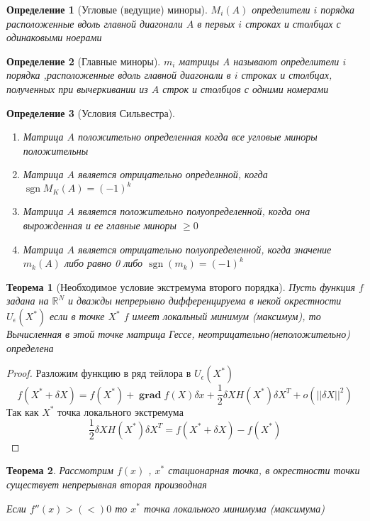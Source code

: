 \documentclass[14pt]{extarticle}
\newtheorem{theorem}{Теорема}
\newtheorem{definiiton}{Определение}
\DeclareMathOperator{\grad}{\textbf{grad}}
\DeclareMathOperator{\sgn}{sgn}
\begin{document}
\begin{definiiton}[Угловые (ведущие) миноры]
	$M_{i}(A)$ определители $i$ порядка расположенные вдоль
	главной диагонали  $A$ в первых  $i$ строках и столбцах с
	одинаковыми ноерами
\end{definiiton}
\begin{definiiton}[Главные миноры]
	$m_{i}$ матрицы A называют определители $i$ порядка
	,расположенные вдоль главной диагонали в  $i$ строках и столбцах, полученных при вычеркивании из  $A$ строк и столбцов с одними номерами
\end{definiiton}
\begin{definiiton}[Условия Сильвестра]
	 \begin{enumerate}
		\item Матрица $A$ положительно определенная  когда
			все угловые миноры положительны
		\item Матрица $A$ является отрицательно определнной, когда  $\sgn M_{K}(A) = (-1)^{k}$
		\item Матрица $A$ является положительно полуопределенной, когда она вырожденная и ее главные миноры  $\ge 0$
		\item Матрица $A$ является отрицательно полуопределенной, когда значение  $m_{k}(A)$ либо равно 0 либо $\sgn(m_{k}) = (-1)^{k}$
	\end{enumerate}
\end{definiiton}
\begin{theorem}[Необходимое условие экстремума второго порядка]
	Пусть функция $f$ задана на  $\mathbb{R}^{N}$ 
	и дважды непрерывно дифференцируема в некой окрестности 
	$U_{\epsilon}(X^{*})$ если в точке 
	$X^{*}$ $f$ имеет локальный минимум (максимум),
	то Вычисленная в этой точке матрица Гессе, неотрицательно(неположительно) определена
\end{theorem}
\begin{proof}
	Разложим функцию в ряд тейлора в $U_{\epsilon}(X^{*})$
	 \begin{equation}
		 f(X^{*} + \delta X) = f(X^{*}) + \grad f(X) \delta x  + \frac{1}{2} \delta X H(X^{*}) \delta X^{T} + o(||\delta X||^2)
	 \end{equation}
	 Так как $X^{*}$ точка локального экстремума
	 \begin{equation}
	 	\frac{1}{2} \delta X H(X^{*}) \delta X^{T} =
		f(X^{*} + \delta X) - f(X^{*})
	 \end{equation}
\end{proof}
\begin{theorem}
	Рассмотрим $f(x)$ ,  $x^{*}$ стационарная точка,
	в окрестности точки существует непрерывная вторая производная

	Если $f''(x) > (<) 0$ то  $x^{*}$ точка локального минимума (максимума)
\end{theorem}
\end{document}
